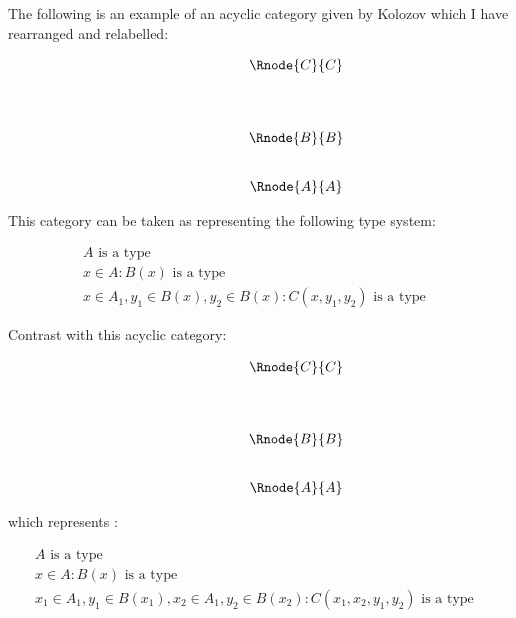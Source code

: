 \documentclass[10pt,a4paper]{scrartcl}
\begin{document}
The following is an example of an acyclic category given by Kolozov which I have rearranged and relabelled:

\begin{center}
\begin{equation}
\begin{array}{p{1.5cm}cccp{2cm}c}
&                & \Rnode{C}{C}&   \\ [1.4cm]
&                & \Rnode{B}{B} &  \\ [0.8cm]
&                & \Rnode{A}{A} &  
\end{array}
\end{equation}
\setlength {\saroffsetA}{-2pt}
\setlength {\saroffsetB}{-2pt}
\sarreset
\end{center}



\noindent This category can be taken as representing the following type system:
\addtocounter{equation}{-1}
\begin{align}
&A\mbox{ is a type} && \tag*{(\theequation a)}\\
&x\in A: B(x) \mbox{ is a type} && \tag*{(\theequation b)}\\
&x\in A_1, y_1 \in B(x), y_2 \in B(x) : C(x,y_1,y_2) \mbox{ is a type} && \tag*{(\theequation c)}
\end{align}

\noindent
Contrast with this acyclic category:
\begin{center}
\begin{equation}
\begin{array}{p{1.5cm}cccp{2cm}c}
&                & \Rnode{C}{C}&   \\ [1.4cm]
&                & \Rnode{B}{B} &  \\ [0.8cm]
&                & \Rnode{A}{A} &  
\end{array}
\end{equation}
\setlength {\saroffsetA}{-2pt}
\setlength {\saroffsetB}{-2pt}
\setlength {\saroffsetA}{2pt}
\setlength {\saroffsetB}{2pt}
\sarreset
\end{center}
\noindent
which represents :
\addtocounter{equation}{-1}
\begin{align}
&A\mbox{ is a type} && \tag*{(\theequation a)}\\
&x\in A: B(x) \mbox{ is a type} && \tag*{(\theequation b)}\\
&x_1\in A_1, y_1 \in B(x_1), x_2\in A_1, y_2 \in B(x_2) : C(x_1,x_2,y_1,y_2) \mbox{ is a type} && \tag*{(\theequation c)}
\end{align}
\end{document}
